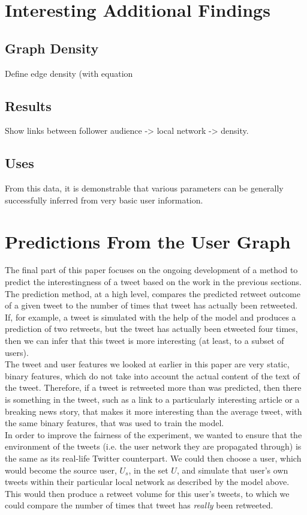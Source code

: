 \section{Interesting Additional Findings}

\subsection{Graph Density}
Define edge density (with equation

\subsection{Results}
Show links between follower audience -> local network -> density.

\subsection{Uses}
From this data, it is demonstrable that various parameters can be generally successfully inferred from very basic user information.

\section{Predictions From the User Graph}
The final part of this paper focuses on the ongoing development of a method to predict the interestingness of a tweet based on the work in the previous sections. The prediction method, at a high level, compares the predicted retweet outcome of a given tweet to the number of times that tweet has actually been retweeted. If, for example, a tweet is simulated with the help of the model and produces a prediction of two retweets, but the tweet has actually been etweeted four times, then we can infer that this tweet is more interesting (at least, to a subset of users). 
\\
The tweet and user features we looked at earlier in this paper are very static, binary features, which do not take into account the actual content of the text of the tweet. Therefore, if a tweet is retweeted more than was predicted, then there is something in the tweet, such as a link to a particularly interesting article or a breaking news story, that makes it more interesting than the average tweet, with the same binary features, that was used to train the model.
\\
In order to improve the fairness of the experiment, we wanted to ensure that the environment of the tweets (i.e. the user network they are propagated through) is the same as its real-life Twitter counterpart. We could then choose a user, which would become the source user, $U_s$, in the set $U$, and simulate that user's own tweets within their particular local network as described by the model above. This would then produce a retweet volume for this user's tweets, to which we could compare the number of times that tweet has \emph{really} been retweeted.


